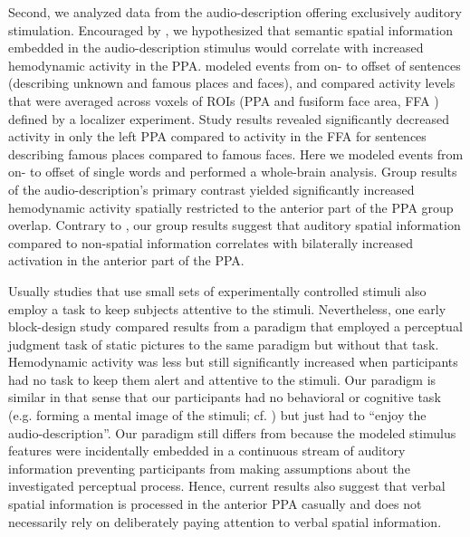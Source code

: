 \documentclass[english]{article}
\begin{document}
Second, we analyzed data from the audio-description offering exclusively
auditory stimulation.
Encouraged by \citep{aziz2008modulation}, we hypothesized that semantic spatial
information embedded in the audio-description stimulus would correlate with
increased hemodynamic activity in the PPA.
\citep{aziz2008modulation} modeled events from on- to offset of sentences
(describing unknown and famous places and faces), and compared activity levels
that were averaged across voxels of ROIs (PPA and fusiform face area, FFA
\citep{kanwisher1997ffa}) defined by a localizer experiment.
Study results revealed significantly decreased activity in only the left PPA
compared to activity in the FFA for sentences describing famous places compared
to famous faces.
Here we modeled events from on- to offset of single words and performed a
whole-brain analysis.
Group results of the audio-description's primary contrast yielded significantly
increased hemodynamic activity spatially restricted to the anterior part of the
PPA group overlap.
Contrary to \citep{aziz2008modulation}, our group results suggest that auditory
spatial information compared to non-spatial information correlates with
bilaterally increased activation in the anterior part of the PPA.

Usually studies that use small sets of experimentally controlled stimuli also
employ a task to keep subjects attentive to the stimuli.
Nevertheless, one early block-design study \citep{epstein1998ppa} compared
results from a paradigm that employed a perceptual judgment task of static
pictures to the same paradigm but without that task.
Hemodynamic activity was less but still significantly increased when
participants had no task to keep them alert and attentive to the stimuli.
Our paradigm is similar in that sense that our participants had no behavioral or
cognitive task (e.g. forming a mental image of the stimuli; cf.
\citep{ocraven2000mental})  but just had to ``enjoy the audio-description''.
Our paradigm still differs from \citep{epstein1998ppa} because the modeled
stimulus features were incidentally embedded in a continuous stream of auditory
information preventing participants from making assumptions about the
investigated perceptual process.
Hence, current results also suggest that verbal spatial information is processed
in the anterior PPA casually and does not necessarily rely on deliberately
paying attention to verbal spatial information.
\end{document}

